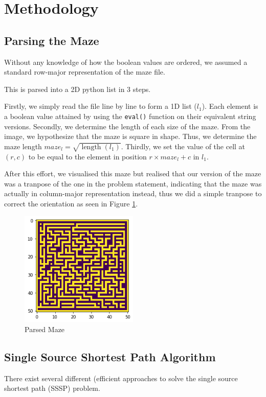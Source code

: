 \documentclass{article}
\DeclareMathOperator{\length}{length}
\begin{document}
\section{Methodology}
    \subsection{Parsing the Maze}
    Without any knowledge of how the boolean values are ordered, we assumed a standard row-major representation of the maze file.

    This is parsed into a 2D python list in 3 steps.

    Firstly, we simply read the file line by line to form a 1D list ($l_1$). Each element is a boolean value attained by using the \texttt{eval()} function on their equivalent string versions. Secondly, we determine the length of each size of the maze. From the image, we hypothesize that the maze is square in shape. Thus, we determine the maze length $maze_l = \sqrt{\length({l_1})}$. Thirdly, we set the value of the cell at $(r, c)$ to be equal to the element in position $r \times maze_l + c$ in $l_1$.

    After this effort, we visualised this maze but realised that our version of the maze was a tranpose of the one in the problem statement, indicating that the maze was actually in column-major representation instead, thus we did a simple tranpose to correct the orientation as seen in Figure \ref{fig:parsed_maze}.

    \begin{figure}[H]
        \centering
        \includegraphics[width=0.5\textwidth]{img/parsed_maze.png}
        \caption{Parsed Maze}
        \label{fig:parsed_maze}
    \end{figure}


    \subsection{Single Source Shortest Path Algorithm}
    There exist several different (efficient approaches to solve the single source shortest path (SSSP) problem.
\end{document}
